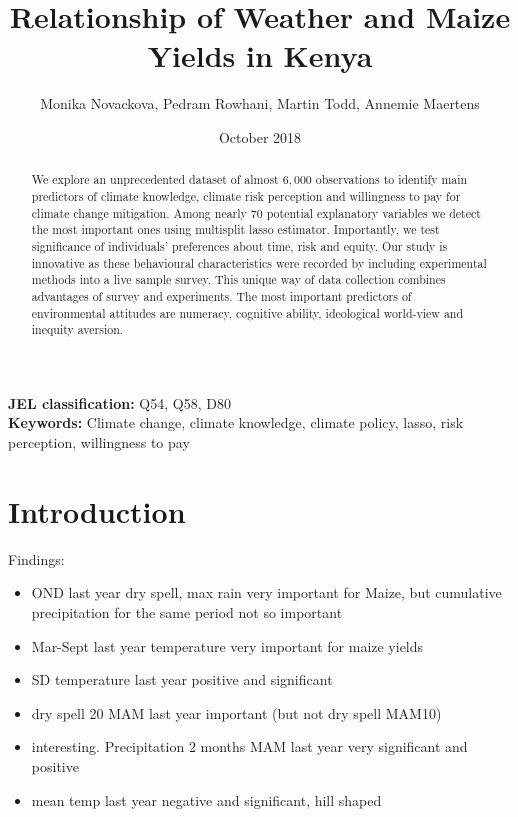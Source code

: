 \documentclass[a4paper,12pt]{article}
\date{\normalsize{October 2018}}
\title{\Large \bf Relationship of Weather and Maize Yields in Kenya}
\author{Monika Novackova, Pedram Rowhani, Martin Todd, Annemie Maertens}
\affil{\small{Department of Geography, University of Sussex, Falmer, UK}}
\begin{document}
  

\makeatletter
\def\hlinewd#1{%
\noalign{\ifnum0=`}\fi\hrule \@height #1 %
\futurelet\reserved@a\@xhline}
\makeatother

\maketitle
\vfill

\doublespacing

\begin{abstract}
\noindent We explore an unprecedented dataset of almost $6,000$ observations to identify main predictors of climate knowledge, climate risk perception and willingness to pay for climate change mitigation. Among nearly $70$ potential explanatory variables we detect the most important ones using multisplit lasso estimator. Importantly, we test significance of individuals' preferences about time, risk and equity. Our study is innovative as these behavioural characteristics were recorded by including experimental methods into a live sample survey. This unique way of data collection combines advantages of survey and experiments. The most important predictors of environmental attitudes are numeracy, cognitive ability, ideological world-view and inequity aversion. \\
\end{abstract}


\noindent \textbf{JEL classification:} Q54, Q58, D80\\
\noindent \textbf{Keywords:} Climate change, climate knowledge, climate policy, lasso, risk perception, willingness to pay\\




\newpage
\sloppy


\section{Introduction}\label{Introduction}


\large Findings:
\begin{itemize}
\item OND last year dry spell, max rain very important for Maize, but cumulative precipitation for the same period not so important

\item Mar-Sept last year temperature very important for maize yields
\item SD temperature last year positive and significant
\item dry spell 20 MAM last year important (but not dry spell MAM10)
\item interesting. Precipitation 2 months MAM last year very significant and positive
\item mean temp last year negative and significant, hill shaped 
\end{itemize}
\end{document}
